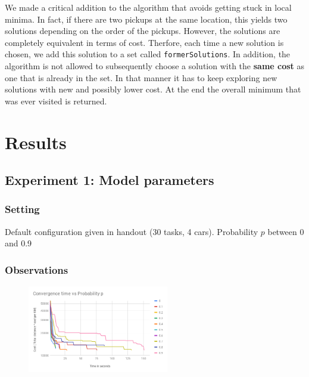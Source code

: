 \documentclass[11pt]{article}
\begin{document}
 We made a critical addition to the algorithm that avoids getting stuck in local
 minima. In fact, if there are two pickups at the same location, this yields two
 solutions depending on the order of the pickups. However, the solutions are
 completely equivalent in terms of cost. Therfore, each time a new solution is
 chosen, we add this solution to a set called \texttt{formerSolutions}. In
 addition, the algorithm is not allowed to subsequently choose a solution with
 the \textbf{same cost} as one that is already in the set. In that manner it has
 to keep exploring new solutions with new and possibly lower cost. At the end
 the overall minimum that was ever visited is returned.


 \section{Results}

 \subsection{Experiment 1: Model parameters}

 \subsubsection{Setting}
 Default configuration given in handout (30 tasks, 4 cars). Probability $p$
 between 0 and 0.9 
 
 \subsubsection{Observations} 
 
 \begin{figure}
    \vspace{-20pt}
 \includegraphics[width=0.55\textwidth]{convergence.png} 
   \vspace{-20pt}
 \end{figure} 
 
\end{document}

